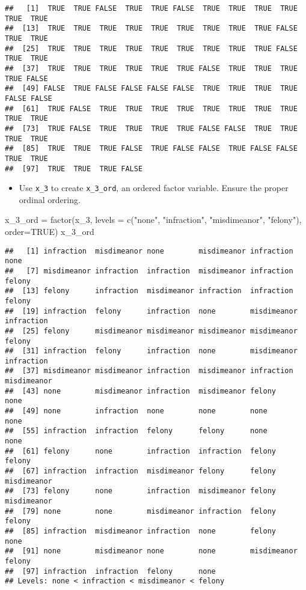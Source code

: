 \documentclass[
]{article}
\newenvironment{Shaded}{\begin{snugshade}}{\end{snugshade}}
\newcommand{\AttributeTok}[1]{\textcolor[rgb]{0.77,0.63,0.00}{#1}}
\newcommand{\ConstantTok}[1]{\textcolor[rgb]{0.00,0.00,0.00}{#1}}
\newcommand{\FunctionTok}[1]{\textcolor[rgb]{0.00,0.00,0.00}{#1}}
\newcommand{\NormalTok}[1]{#1}
\newcommand{\OtherTok}[1]{\textcolor[rgb]{0.56,0.35,0.01}{#1}}
\newcommand{\StringTok}[1]{\textcolor[rgb]{0.31,0.60,0.02}{#1}}
\providecommand{\tightlist}{%
  \setlength{\itemsep}{0pt}\setlength{\parskip}{0pt}}
\begin{document}
\begin{verbatim}
##   [1]  TRUE  TRUE FALSE  TRUE  TRUE FALSE  TRUE  TRUE  TRUE  TRUE  TRUE  TRUE
##  [13]  TRUE  TRUE  TRUE  TRUE  TRUE  TRUE  TRUE  TRUE  TRUE FALSE  TRUE  TRUE
##  [25]  TRUE  TRUE  TRUE  TRUE  TRUE  TRUE  TRUE  TRUE  TRUE FALSE  TRUE  TRUE
##  [37]  TRUE  TRUE  TRUE  TRUE  TRUE  TRUE FALSE  TRUE  TRUE  TRUE  TRUE FALSE
##  [49] FALSE  TRUE FALSE FALSE FALSE FALSE  TRUE  TRUE  TRUE  TRUE FALSE FALSE
##  [61]  TRUE FALSE  TRUE  TRUE  TRUE  TRUE  TRUE  TRUE  TRUE  TRUE  TRUE  TRUE
##  [73]  TRUE FALSE  TRUE  TRUE  TRUE  TRUE FALSE FALSE  TRUE  TRUE  TRUE  TRUE
##  [85]  TRUE  TRUE  TRUE FALSE  TRUE FALSE FALSE  TRUE FALSE FALSE  TRUE  TRUE
##  [97]  TRUE  TRUE  TRUE FALSE
\end{verbatim}

\begin{itemize}
\tightlist
\item
  Use \texttt{x\_3} to create \texttt{x\_3\_ord}, an ordered factor
  variable. Ensure the proper ordinal ordering.
\end{itemize}

\begin{Shaded}
\begin{Highlighting}[]
\NormalTok{x\_3\_ord }\OtherTok{=} \FunctionTok{factor}\NormalTok{(x\_3, }\AttributeTok{levels =} \FunctionTok{c}\NormalTok{(}\StringTok{"none"}\NormalTok{,  }\StringTok{"infraction"}\NormalTok{, }\StringTok{"misdimeanor"}\NormalTok{, }\StringTok{"felony"}\NormalTok{), }\AttributeTok{order=}\ConstantTok{TRUE}\NormalTok{)}
\NormalTok{x\_3\_ord}
\end{Highlighting}
\end{Shaded}

\begin{verbatim}
##   [1] infraction  misdimeanor none        misdimeanor infraction  none       
##   [7] misdimeanor infraction  infraction  misdimeanor infraction  felony     
##  [13] felony      infraction  misdimeanor infraction  infraction  felony     
##  [19] infraction  felony      infraction  none        misdimeanor infraction 
##  [25] felony      misdimeanor misdimeanor misdimeanor misdimeanor felony     
##  [31] infraction  felony      infraction  none        misdimeanor infraction 
##  [37] misdimeanor misdimeanor infraction  misdimeanor infraction  misdimeanor
##  [43] none        misdimeanor infraction  misdimeanor felony      none       
##  [49] none        infraction  none        none        none        none       
##  [55] infraction  infraction  felony      felony      none        none       
##  [61] felony      none        infraction  infraction  felony      felony     
##  [67] infraction  infraction  misdimeanor felony      felony      misdimeanor
##  [73] felony      none        infraction  misdimeanor felony      misdimeanor
##  [79] none        none        misdimeanor infraction  felony      felony     
##  [85] infraction  misdimeanor infraction  none        felony      none       
##  [91] none        misdimeanor none        none        misdimeanor felony     
##  [97] infraction  infraction  felony      none       
## Levels: none < infraction < misdimeanor < felony
\end{verbatim}
\end{document}
